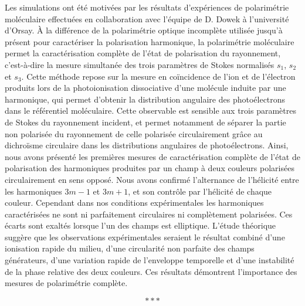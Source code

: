 Les simulations ont été motivées par les résultats d'expériences de polarimétrie moléculaire effectuées en collaboration avec l'équipe de D. Dowek à l'université d'Orsay. \`{A} la différence de la polarimétrie optique incomplète utilisée jusqu'à présent pour caractériser la polarisation harmonique, la polarimétrie moléculaire permet la caractérisation complète de l'état de polarisation du rayonnement, c'est-à-dire la mesure simultanée des trois paramètres de Stokes normalisés $s_1$, $s_2$ et $s_3$. Cette méthode repose sur la mesure en coïncidence de l'ion et de l'électron produits lors de la photoionisation dissociative d'une molécule induite par une harmonique, qui permet d'obtenir la distribution angulaire des photoélectrons dans le référentiel moléculaire. Cette observable est sensible aux trois paramètres de Stokes du rayonnement incident, et permet notamment de séparer la partie non polarisée du rayonnement de celle polarisée circulairement grâce au dichroïsme circulaire dans les distributions angulaires de photoélectrons. Ainsi, nous avons présenté les premières mesures de caractérisation complète de l'état de polarisation des harmoniques produites par un champ à deux couleurs polarisées circulairement en sens opposé. Nous avons confirmé l'alternance de l'hélicité entre les harmoniques $3m-1$ et $3m+1$, et son contrôle par l'hélicité de chaque couleur. Cependant dans nos conditions expérimentales les harmoniques caractérisées ne sont ni parfaitement circulaires ni complètement polarisées. Ces écarts sont exaltés lorsque l'un des champs est elliptique. L'étude théorique suggère que les observations expérimentales seraient le résultat combiné d'une ionisation rapide du milieu, d'une circularité non parfaite des champs générateurs, d'une variation rapide de l'enveloppe temporelle et d'une instabilité de la phase relative des deux couleurs. Ces résultats démontrent l'importance des mesures de polarimétrie complète.

\begin{equation*}
\ast \ast \ast
\end{equation*}


